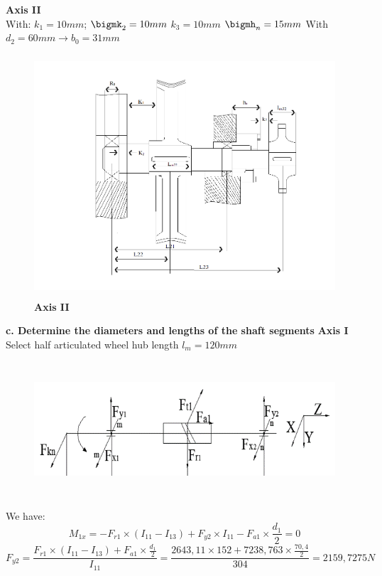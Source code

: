\textbf{ Axis II} \\ 
With:
$k_1=10mm$;
$\bigmk_2=10mm$ 	
$k_3=10mm$
$\bigmh_n=15mm$
With  $	d_2 = 60 mm \rightarrow b_0=31mm$\\
\begin{figure}[!ht]
    \centering
   \centerline{\includegraphics[width=16cm,height=9cm]{Image/axis2.png}}
    \caption[Axis II]{\bfseries \fontsize{12pt}{0pt}\selectfont Axis II}
    \label{figure1}
\end{figure}
\textbf{c. Determine the diameters and lengths of the shaft segments} 
\textbf{ Axis I}\\
Select half articulated wheel hub length $l_m = 120 mm$
\begin{figure}[!ht]
    \centering
   \centerline{\includegraphics[width=16cm,height=5cm]{Image/Picture2.png}}
    \label{figure1}
\end{figure}
We have:\\
$$M_{1x}={-F}_{r1}\times\left(I_{11}-I_{13}\right)+F_{y2}\times I_{11}-F_{a1}\times\frac{d_1}{2}=0$$
$$F_{y2}=\frac{F_{r1}\times\left(I_{11}-I_{13}\right)+F_{a1}\times\frac{d_1}{2}}{I_{11}}=\frac{2643,11\times152+7238,763\times\frac{70,4}{2}}{304}=2159,7275N$$

